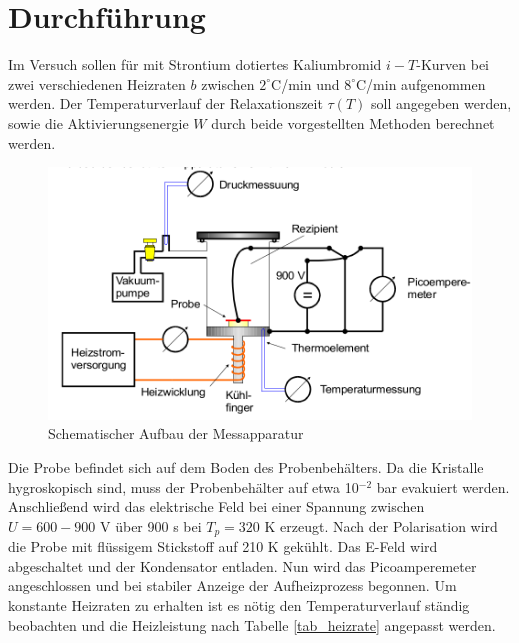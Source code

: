 \section{Durchführung}
Im Versuch sollen für mit Strontium dotiertes Kaliumbromid $i-T$-Kurven bei zwei verschiedenen Heizraten $b$ zwischen $2^\circ$C/min und $8^\circ$C/min
aufgenommen werden. Der Temperaturverlauf der Relaxationszeit $\tau(T)$ soll angegeben werden, sowie die Aktivierungsenergie $W$ durch beide vorgestellten
Methoden berechnet werden.
\begin{figure}[H]
\includegraphics[width=\textwidth]{../pics/dipolAufbau.png}
\caption{Schematischer Aufbau der Messapparatur}
\label{pic_dipolaufbau}
\end{figure}
Die Probe befindet sich auf dem Boden des Probenbehälters. Da die Kristalle hygroskopisch sind, muss der Probenbehälter auf etwa 10$^{-2}$ bar
evakuiert werden. Anschließend wird das elektrische Feld bei einer Spannung zwischen $U = 600-900$ V über 900 s bei $T_p=320$ K erzeugt. Nach der
Polarisation wird die Probe mit flüssigem Stickstoff auf 210 K gekühlt. Das E-Feld wird abgeschaltet und der Kondensator entladen. Nun wird das
Picoamperemeter angeschlossen und bei stabiler Anzeige der Aufheizprozess begonnen. Um konstante Heizraten zu erhalten ist es nötig den Temperaturverlauf
ständig beobachten und die Heizleistung nach Tabelle \ref{tab_heizrate} angepasst werden.

